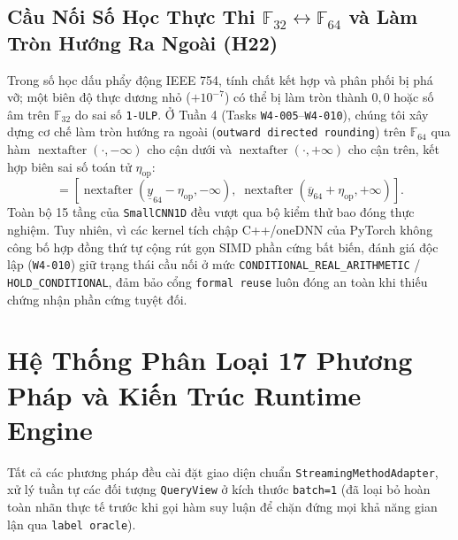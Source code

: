 \documentclass[11pt,a4paper]{article}
\newcommand{\F}{\mathbb{F}}
\newcommand{\code}[1]{{\small\ttfamily\nolinkurl{#1}}}
\theoremstyle{remark}
\begin{document}
\subsection{\texorpdfstring{Cầu Nối Số Học Thực Thi $\F_{32} \leftrightarrow \F_{64}$ và Làm Tròn Hướng Ra Ngoài (H22)}{Cầu Nối Số Học Thực Thi F32-F64 và Làm Tròn Hướng Ra Ngoài (H22)}}
Trong số học dấu phẩy động IEEE 754, tính chất kết hợp và phân phối bị phá vỡ; một biên độ thực dương nhỏ ($+10^{-7}$) có thể bị làm tròn thành $0,0$ hoặc số âm trên $\F_{32}$ do sai số \code{1-ULP}. Ở Tuần 4 (Tasks \code{W4-005}--\code{W4-010}), chúng tôi xây dựng cơ chế làm tròn hướng ra ngoài (\code{outward directed rounding}) trên $\F_{64}$ qua hàm $\operatorname{nextafter}(\cdot, -\infty)$ cho cận dưới và $\operatorname{nextafter}(\cdot, +\infty)$ cho cận trên, kết hợp biên sai số toán tử $\eta_{\text{op}}$:
\begin{equation}
  [\underline{y}_{\text{safe}}, \overline{y}_{\text{safe}}] = \left[ \operatorname{nextafter}(\underline{y}_{64} - \eta_{\text{op}}, -\infty), \; \operatorname{nextafter}(\overline{y}_{64} + \eta_{\text{op}}, +\infty) \right].
\end{equation}
Toàn bộ 15 tầng của \code{SmallCNN1D} đều vượt qua bộ kiểm thử bao đóng thực nghiệm. Tuy nhiên, vì các kernel tích chập C++/oneDNN của PyTorch không công bố hợp đồng thứ tự cộng rút gọn SIMD phần cứng bất biến, đánh giá độc lập (\code{W4-010}) giữ trạng thái cầu nối ở mức \code{CONDITIONAL\_REAL\_ARITHMETIC} / \code{HOLD\_CONDITIONAL}, đảm bảo cổng \code{formal reuse} luôn đóng an toàn khi thiếu chứng nhận phần cứng tuyệt đối.

\section{Hệ Thống Phân Loại 17 Phương Pháp và Kiến Trúc Runtime Engine}

Tất cả các phương pháp đều cài đặt giao diện chuẩn \code{StreamingMethodAdapter}, xử lý tuần tự các đối tượng \code{QueryView} ở kích thước \code{batch=1} (đã loại bỏ hoàn toàn nhãn thực tế trước khi gọi hàm suy luận để chặn đứng mọi khả năng gian lận qua \code{label oracle}).
\end{document}
